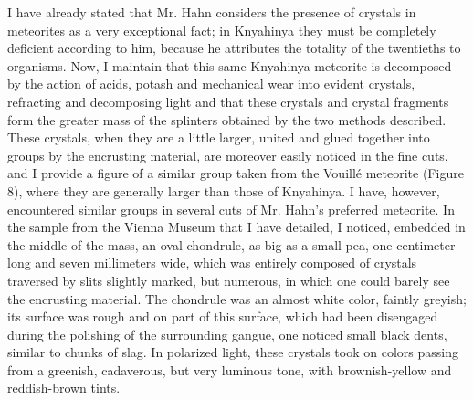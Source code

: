 \documentclass[a4paper, 12pt, oneside]{article}
\begin{document}
I have already stated that Mr. Hahn considers the presence of crystals in meteorites as a very exceptional fact; in Knyahinya they must be completely deficient according to him, because he attributes the totality of the twentieths to organisms. Now, I maintain that this same Knyahinya meteorite is decomposed by the action of acids, potash and mechanical wear into evident crystals, refracting and decomposing light and that these crystals and crystal fragments form the greater mass of the splinters obtained by the two methods described. These crystals, when they are a little larger, united and glued together into groups by the encrusting material, are moreover easily noticed in the fine cuts, and I provide a figure of a similar group taken from the Vouillé meteorite (Figure 8), where they are generally larger than those of Knyahinya. I have, however, encountered similar groups in several cuts of Mr. Hahn's preferred meteorite. In the sample from the Vienna Museum that I have detailed, I noticed, embedded in the middle of the mass, an oval chondrule, as big as a small pea, one centimeter long and seven millimeters wide, which was entirely composed of crystals traversed by slits slightly marked, but numerous, in which one could barely see the encrusting material. The chondrule was an almost white color, faintly greyish; its surface was rough and on part of this surface, which had been disengaged during the polishing of the surrounding gangue, one noticed small black dents, similar to chunks of slag. In polarized light, these crystals took on colors passing from a greenish, cadaverous, but very luminous tone, with brownish-yellow and reddish-brown tints.
\end{document}

